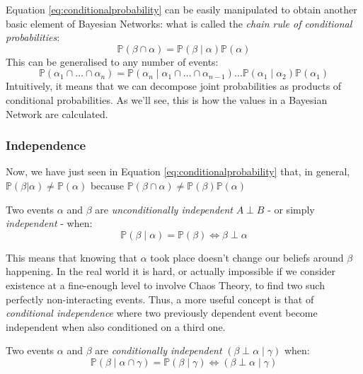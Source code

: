 Equation \ref{eq:conditionalprobability} can be easily manipulated to obtain another basic element of Bayesian Networks: what is called the \textit{chain rule of conditional probabilities}:
\begin{equation} \label{eq:chainrule}
	\mathbb{P}(\beta \cap \alpha) = \mathbb{P}(\beta \mid \alpha) \mathbb{P}(\alpha)
\end{equation}
This can be generalised to any number of events:
\begin{equation} \label{eq:chainrule}
	\mathbb{P}(\alpha_1 \cap \ldots \cap \alpha_n) = \mathbb{P}(\alpha_n \mid \alpha_1 \cap \ldots \cap \alpha_{n-1}) \ldots \mathbb{P}(\alpha_1 \mid \alpha_2 ) \mathbb{P}(\alpha_1) 
\end{equation}
Intuitively, it means that we can decompose joint probabilities as products of conditional probabilities.  
As we'll see, this is how the values in a Bayesian Network are calculated.

\subsubsection{Independence}
Now, we have just seen in Equation \ref{eq:conditionalprobability} that, in general, $\mathbb{P}(\beta | \alpha) \neq \mathbb{P}(\alpha)$ because $\mathbb{P}(\beta \cap \alpha) \neq \mathbb{P}(\beta) \mathbb{P}(\alpha)$
\begin{definition}
Two events $\alpha$ and $\beta$ are \textit{unconditionally independent} $A \perp B$ - or simply \textit{independent} - when:
\begin{equation}
	\mathbb{P}(\beta \mid \alpha) = \mathbb{P}(\beta) \Leftrightarrow \beta \perp \alpha
\end{equation}
\end{definition}
This means that knowing that $\alpha$ took place doesn't change our beliefs around $\beta$ happening. 
In the real world it is hard, or actually impossible if we consider existence at a fine-enough level to involve Chaos Theory, to find two such perfectly non-interacting events.
Thus, a more useful concept is that of \textit{conditional independence} where two previously dependent event become independent when also conditioned on a third one.
\begin{definition}
Two events $\alpha$ and $\beta$ are \textit{conditionally independent} $(\beta \perp \alpha \mid \gamma)$ when:
	\begin{equation}
	\mathbb{P}(\beta \mid \alpha \cap \gamma ) = \mathbb{P}(\beta \mid \gamma) \Leftrightarrow (\beta \perp \alpha \mid \gamma)
\end{equation}
\end{definition}

